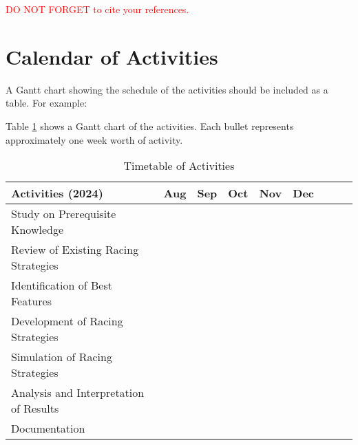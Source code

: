 \textcolor{red}{DO NOT FORGET to cite your references.}

\section{Calendar of Activities}

A Gantt chart showing the schedule of the activities should be included as a table. For example:

Table \ref{tab:timetableactivities} shows a Gantt chart of the activities.  Each bullet represents approximately
one week worth of activity.

%
%
\newcommand{\weekone}{\textbullet}
\newcommand{\weektwo}{\textbullet \textbullet}
\newcommand{\weekthree}{\textbullet \textbullet \textbullet}
\newcommand{\weekfour}{\textbullet \textbullet \textbullet \textbullet}

%
%
\begin{comment}
   \newcommand{\weekone}{$\star$}
   \newcommand{\weektwo}{$\star \star$}
   \newcommand{\weekthree}{$\star \star \star$}
   \newcommand{\weekfour}{$\star \star \star \star$ }
\end{comment}



\begin{table}[ht]   %
	\centering
	\caption{Timetable of Activities}
	\vspace{0.25em}
	\begin{tabular}{|p{2.5in}|c|c|c|c|c|c|c|c|} 
		\hline
		\centering Activities (2024) & Aug & Sep & Oct & Nov & Dec \\ 
		\hline
		Study on Prerequisite Knowledge & & & \weektwo & \weekfour & \\ 
		\hline
		Review of Existing Racing Strategies & \weektwo & \weekfour & \weekfour & \weekfour &  \\ 
		\hline
		Identification of Best Features & & & & \weekfour & \weektwo \\ 
		\hline
		Development of Racing Strategies & & & & \weektwo & \weekfour \\ 
		\hline
		Simulation of Racing Strategies & & & & \weektwo & \weekfour \\ 
		\hline
		Analysis and Interpretation of Results & & & & \weekfour & \weekfour \\ 
		\hline
		Documentation & & \weektwo & \weekfour & \weekfour & \weekfour \\ 
		\hline
	\end{tabular}
	\label{tab:timetableactivities}
\end{table}



